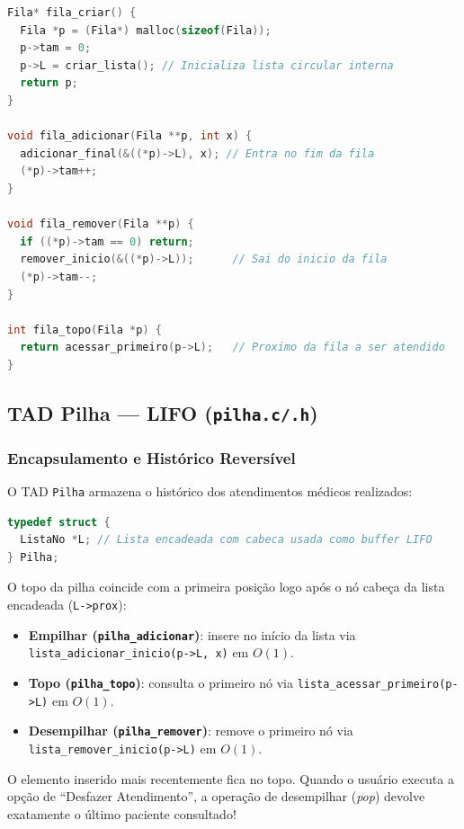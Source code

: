 \documentclass[11pt,a4paper]{article}
\begin{document}
\begin{lstlisting}[language=C, caption={{Operações da Fila FIFO}}]
Fila* fila_criar() {
  Fila *p = (Fila*) malloc(sizeof(Fila));
  p->tam = 0;
  p->L = criar_lista(); // Inicializa lista circular interna
  return p; 
}

void fila_adicionar(Fila **p, int x) {
  adicionar_final(&((*p)->L), x); // Entra no fim da fila
  (*p)->tam++;
}

void fila_remover(Fila **p) {
  if ((*p)->tam == 0) return;
  remover_inicio(&((*p)->L));      // Sai do inicio da fila
  (*p)->tam--;
}

int fila_topo(Fila *p) {
  return acessar_primeiro(p->L);   // Proximo da fila a ser atendido
}
\end{lstlisting}

\subsection{TAD Pilha — LIFO (\texttt{pilha.c/.h})}

\subsubsection{Encapsulamento e Histórico Reversível}
O TAD \texttt{Pilha} armazena o histórico dos atendimentos médicos realizados:
\begin{lstlisting}[language=C]
typedef struct {
  ListaNo *L; // Lista encadeada com cabeca usada como buffer LIFO
} Pilha;
\end{lstlisting}

O topo da pilha coincide com a primeira posição logo após o nó cabeça da lista encadeada (\texttt{L->prox}):
\begin{itemize}
    \item \textbf{Empilhar (\texttt{pilha\_adicionar})}: insere no início da lista via \texttt{lista\_adicionar\_inicio(p->L, x)} em $O(1)$.
    \item \textbf{Topo (\texttt{pilha\_topo})}: consulta o primeiro nó via \texttt{lista\_acessar\_primeiro(p->L)} em $O(1)$.
    \item \textbf{Desempilhar (\texttt{pilha\_remover})}: remove o primeiro nó via \texttt{lista\_remover\_inicio(p->L)} em $O(1)$.
\end{itemize}

O elemento inserido mais recentemente fica no topo. Quando o usuário executa a opção de ``Desfazer Atendimento'', a operação de desempilhar (\textit{pop}) devolve exatamente o último paciente consultado!
\end{document}

